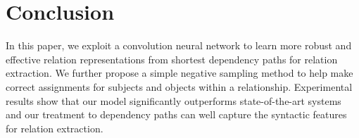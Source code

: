 \documentclass[11pt,a4paper]{article}
\begin{document}
\section{Conclusion}


In this paper, we exploit a convolution neural network to learn more robust and effective relation representations from shortest dependency paths 
for relation extraction. We further propose a simple  negative sampling method to help make correct assignments for subjects and objects within a relationship. 
Experimental results show that our model significantly outperforms state-of-the-art systems and our treatment to dependency paths
 can well capture the syntactic features for relation extraction. 






\end{document}

